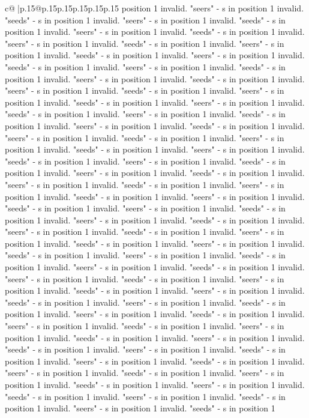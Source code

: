 \documentclass{article}
\begin{document}
{\begin{supertabular}{c@{$\;$}|p{.15\linewidth}@{}p{.15\linewidth}p{.15\linewidth}p{.15\linewidth}p{.15\linewidth}p{.15\linewidth}}
{{{position 1 invalid. "seers" {-} s in position 1 invalid. "seeds" {-} s in position 1 invalid. "seers" {-} s in position 1 invalid. "seeds" {-} s in position 1 invalid. "seers" {-} s in position 1 invalid. "seeds" {-} s in position 1 invalid. "seers" {-} s in position 1 invalid. "seeds" {-} s in position 1 invalid. "seers" {-} s in position 1 invalid. "seeds" {-} s in position 1 invalid. "seers" {-} s in position 1 invalid. "seeds" {-} s in position 1 invalid. "seers" {-} s in position 1 invalid. "seeds" {-} s in position 1 invalid. "seers" {-} s in position 1 invalid. "seeds" {-} s in position 1 invalid. "seers" {-} s in position 1 invalid. "seeds" {-} s in position 1 invalid. "seers" {-} s in position 1 invalid. "seeds" {-} s in position 1 invalid. "seers" {-} s in position 1 invalid. "seeds" {-} s in position 1 invalid. "seers" {-} s in position 1 invalid. "seeds" {-} s in position 1 invalid. "seers" {-} s in position 1 invalid. "seeds" {-} s in position 1 invalid. "seers" {-} s in position 1 invalid. "seeds" {-} s in position 1 invalid. "seers" {-} s in position 1 invalid. "seeds" {-} s in position 1 invalid. "seers" {-} s in position 1 invalid. "seeds" {-} s in position 1 invalid. "seers" {-} s in position 1 invalid. "seeds" {-} s in position 1 invalid. "seers" {-} s in position 1 invalid. "seeds" {-} s in position 1 invalid. "seers" {-} s in position 1 invalid. "seeds" {-} s in position 1 invalid. "seers" {-} s in position 1 invalid. "seeds" {-} s in position 1 invalid. "seers" {-} s in position 1 invalid. "seeds" {-} s in position 1 invalid. "seers" {-} s in position 1 invalid. "seeds" {-} s in position 1 invalid. "seers" {-} s in position 1 invalid. "seeds" {-} s in position 1 invalid. "seers" {-} s in position 1 invalid. "seeds" {-} s in position 1 invalid. "seers" {-} s in position 1 invalid. "seeds" {-} s in position 1 invalid. "seers" {-} s in position 1 invalid. "seeds" {-} s in position 1 invalid. "seers" {-} s in position 1 invalid. "seeds" {-} s in position 1 invalid. "seers" {-} s in position 1 invalid. "seeds" {-} s in position 1 invalid. "seers" {-} s in position 1 invalid. "seeds" {-} s in position 1 invalid. "seers" {-} s in position 1 invalid. "seeds" {-} s in position 1 invalid. "seers" {-} s in position 1 invalid. "seeds" {-} s in position 1 invalid. "seers" {-} s in position 1 invalid. "seeds" {-} s in position 1 invalid. "seers" {-} s in position 1 invalid. "seeds" {-} s in position 1 invalid. "seers" {-} s in position 1 invalid. "seeds" {-} s in position 1 invalid. "seers" {-} s in position 1 invalid. "seeds" {-} s in position 1 invalid. "seers" {-} s in position 1 invalid. "seeds" {-} s in position 1 invalid. "seers" {-} s in position 1 invalid. "seeds" {-} s in position 1 invalid. "seers" {-} s in position 1 invalid. "seeds" {-} s in position 1 invalid. "seers" {-} s in position 1 invalid. "seeds" {-} s in position 1 invalid. "seers" {-} s in position 1 invalid. "seeds" {-} s in position 1 invalid. "seers" {-} s in position 1 invalid. "seeds" {-} s in position 1 invalid. "seers" {-} s in position 1 invalid. "seeds" {-} s in position 1 invalid. "seers" {-} s in position 1 invalid. "seeds" {-} s in position 1 }}}
\end{supertabular}}
\end{document}
